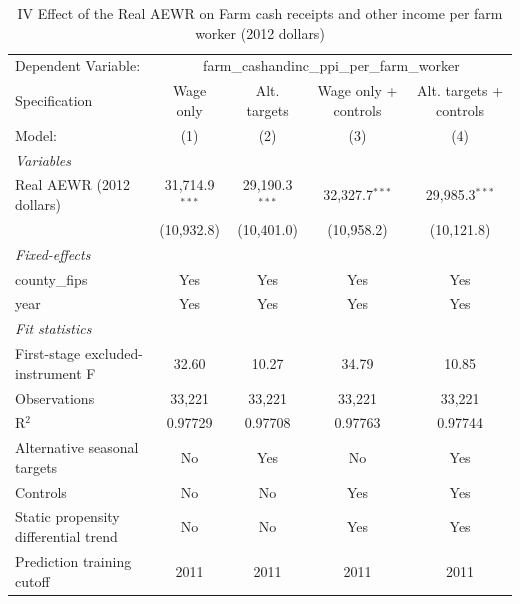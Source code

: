 
\begin{table}[htbp]
   \caption{\label{tab:iv_farm_income} IV Effect of the Real AEWR on Farm cash receipts and other income per farm worker (2012 dollars)}
   \centering
   \begin{tabular}{lcccc}
      \tabularnewline \midrule \midrule
      Dependent Variable: & \multicolumn{4}{c}{farm\_cashandinc\_ppi\_per\_farm\_worker}\\
      Specification                        & Wage only        & Alt. targets     & Wage only + controls & Alt. targets + controls \\   
      Model:                               & (1)              & (2)              & (3)                  & (4)\\  
      \midrule
      \emph{Variables}\\
      Real AEWR (2012 dollars)             & 31,714.9$^{***}$ & 29,190.3$^{***}$ & 32,327.7$^{***}$     & 29,985.3$^{***}$\\   
                                           & (10,932.8)       & (10,401.0)       & (10,958.2)           & (10,121.8)\\   
      \midrule
      \emph{Fixed-effects}\\
      county\_fips                         & Yes              & Yes              & Yes                  & Yes\\  
      year                                 & Yes              & Yes              & Yes                  & Yes\\  
      \midrule
      \emph{Fit statistics}\\
      First-stage excluded-instrument F    & 32.60            & 10.27            & 34.79                & 10.85\\  
      Observations                         & 33,221           & 33,221           & 33,221               & 33,221\\  
      R$^2$                                & 0.97729          & 0.97708          & 0.97763              & 0.97744\\  
      Alternative seasonal targets         & No               & Yes              & No                   & Yes\\  
      Controls                             & No               & No               & Yes                  & Yes\\  
      Static propensity differential trend & No               & No               & Yes                  & Yes\\  
      Prediction training cutoff           & 2011             & 2011             & 2011                 & 2011\\  

\end{tabular}
\end{table}
